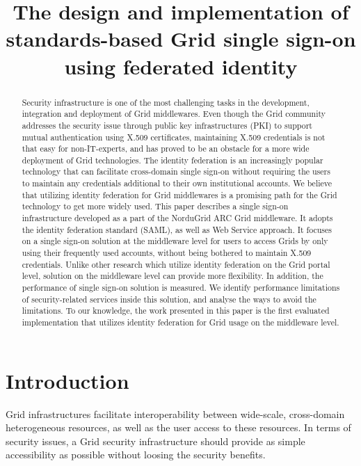 \documentclass[conference]{IEEEtran}
\begin{document}
\title{The design and implementation of standards-based Grid single sign-on using federated identity}

\author{
}

\maketitle


\begin{abstract}
Security infrastructure is one of the most challenging tasks in the development, integration and
deployment of Grid middlewares. Even though the Grid community addresses the security issue 
through public key infrastructures (PKI) to support mutual authentication using X.509 certificates,
maintaining X.509 credentials is not that easy for non-IT-experts, and has proved to be an 
obstacle for a more wide deployment of Grid technologies. The identity federation 
is an increasingly popular technology that can facilitate cross-domain single sign-on
without requiring the users to maintain any credentials additional to their own institutional
accounts. We believe that utilizing identity federation for Grid middlewares is a promising path 
for the Grid technology to get more widely used.
This paper describes a single sign-on infrastructure developed as a part of the NorduGrid ARC Grid 
middleware. It adopts the identity federation standard (SAML), as well as Web Service approach. 
It focuses on a single sign-on solution at the middleware level for users to access Grids by only 
using their frequently used accounts, without being bothered to maintain X.509 credentials. 
Unlike other research which utilize identity federation on the Grid portal level, solution on
the middleware level can provide more flexibility.
In addition, the performance of single sign-on solution is measured. We identify performance limitations 
of security-related services inside this solution, and analyse the ways to avoid the limitations.
To our knowledge, the work presented in this paper is the first evaluated implementation that utilizes 
identity federation for Grid usage on the middleware level.
\end{abstract}

\section{Introduction}
\label{sec:intro}
Grid infrastructures facilitate interoperability between wide-scale, cross-domain heterogeneous 
resources, as well as the user access to these resources. In terms of security issues, a Grid security 
infrastructure should provide as simple accessibility as possible without loosing the security benefits.
\end{document}
